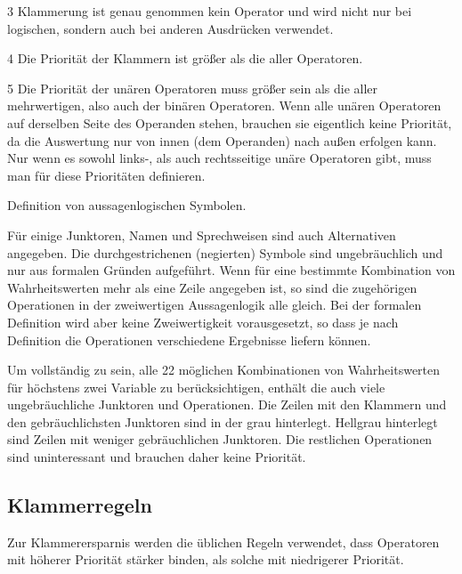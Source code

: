\begin{table}
\begin{threeparttable}
\begin{tablenotes}
			\item[3] Klammerung ist genau genommen kein Operator und wird nicht nur bei logischen, sondern auch bei anderen Ausdrücken verwendet.

			\item[4] Die Priorität der Klammern ist größer als die aller Operatoren.

			\item[5] Die Priorität der unären Operatoren muss größer sein als die aller mehrwertigen, also auch der binären Operatoren.
			Wenn alle unären Operatoren auf derselben Seite des Operanden stehen, brauchen sie eigentlich keine Priorität, da die Auswertung nur von innen (dem Operanden) nach außen erfolgen kann.
			Nur wenn es sowohl links-, als auch rechtsseitige unäre Operatoren gibt, muss man für diese Prioritäten definieren.

		\end{tablenotes}
	\end{threeparttable}
	\caption{Definition von aussagenlogischen Symbolen.}
	\label{tab:Symbole}%
\end{table}

Für einige Junktoren, Namen und Sprechweisen sind auch Alternativen angegeben.
Die durchgestrichenen (\textdh negierten) Symbole sind ungebräuchlich und nur aus formalen Gründen aufgeführt.
Wenn für eine bestimmte Kombination von Wahrheitswerten mehr als eine Zeile angegeben ist, so sind die zugehörigen Operationen in der zweiwertigen Aussagenlogik alle gleich.
Bei der formalen Definition wird aber keine Zweiwertigkeit vorausgesetzt, so dass je nach Definition die Operationen verschiedene Ergebnisse liefern können.

Um vollständig zu sein, \textdh alle 22 möglichen Kombinationen von Wahrheitswerten für höchstens zwei Variable zu berücksichtigen, enthält die \tablename{} auch viele ungebräuchliche Junktoren und Operationen.
Die Zeilen mit den Klammern und den gebräuchlichsten Junktoren sind in der \tablename{} grau hinterlegt.
Hellgrau hinterlegt sind Zeilen mit weniger gebräuchlichen Junktoren.
Die restlichen Operationen sind uninteressant und brauchen daher keine Priorität.

\subsection{Klammerregeln}%
\label{sub:Klammerregeln}

Zur Klammerersparnis werden die üblichen Regeln verwendet, \textdh dass Operatoren mit höherer Priorität stärker binden, als solche mit niedrigerer Priorität.

